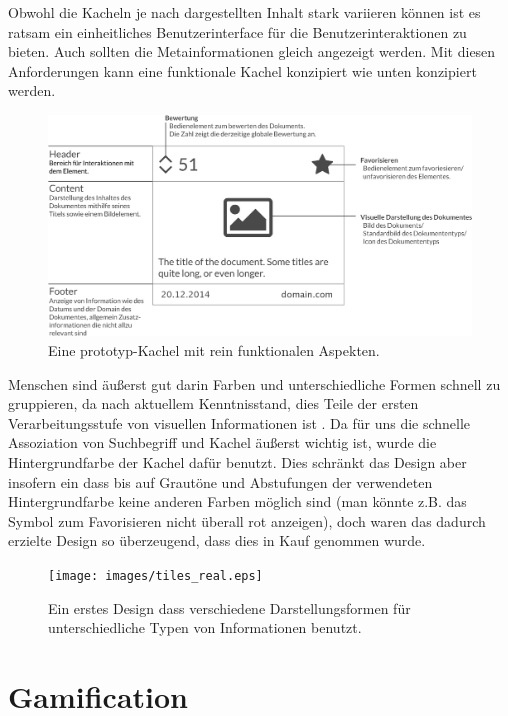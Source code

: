 \documentclass[12pt,twoside]{book}
\begin{document}
Obwohl die Kacheln je nach dargestellten Inhalt stark variieren können ist es ratsam ein einheitliches Benutzerinterface für die Benutzerinteraktionen zu bieten. Auch sollten die Metainformationen gleich angezeigt werden.
Mit diesen Anforderungen kann eine funktionale Kachel konzipiert wie unten konzipiert werden.

\begin{figure}[H]
    \centering
    \includegraphics[width=1.0\textwidth]{images/tiles.eps}
    \caption{Eine prototyp-Kachel mit rein funktionalen Aspekten.}
    \label{fig:awesome_image}
\end{figure}

Menschen sind äußerst gut darin Farben und unterschiedliche Formen schnell zu gruppieren, da nach aktuellem Kenntnisstand, dies Teile der ersten Verarbeitungsstufe von visuellen Informationen ist \citep{treisman1987merkmale}. Da für uns die schnelle Assoziation von Suchbegriff und Kachel äußerst wichtig ist, wurde die Hintergrundfarbe der Kachel dafür benutzt. Dies schränkt das Design aber insofern ein dass bis auf Grautöne und Abstufungen der verwendeten Hintergrundfarbe keine anderen Farben möglich sind (man könnte z.B. das Symbol zum Favorisieren nicht überall rot anzeigen), doch waren das dadurch erzielte Design so überzeugend, dass dies in Kauf genommen wurde.

\begin{figure}[H]
    \centering
    \texttt{[image: images/tiles\_real.eps]}
    \caption{Ein erstes Design dass verschiedene Darstellungsformen für unterschiedliche Typen von Informationen benutzt.}
    \label{fig:awesome_image}
\end{figure}

\section{Gamification}
\end{document}
